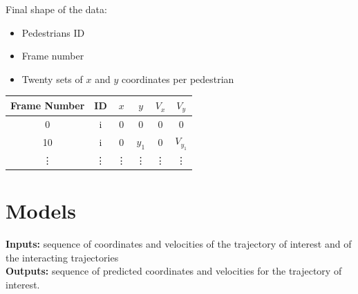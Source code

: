 \documentclass[a0,portrait]{a0poster}
\begin{document}
\begin{multicols}{2}
Final shape of the data:\\
\begin{minipage}[]{0.6\linewidth}
\begin{itemize}
\item Pedestrians ID
\item Frame number 
\item Twenty sets of $x$ and $y$ coordinates per pedestrian
\end{itemize}
\end{minipage}
\hfill
\begin{minipage}[]{0.4\linewidth}
\begin{center}
\begin{tabular}{|c|c|c|c|c|c|}
\hline
Frame Number & ID & $x$ & $y$ & $ V_x$ & $V_y$ \\ \hline
        0     &  i  &  0 &  0 &  0 &  0 \\ \hline
        10     &  i  &  0 &  $y_1$ &  0 &  $V_{y_1}$ \\ \hline
        \vdots     &  \vdots &  \vdots & \vdots &  \vdots &  \vdots \\ \hline
\end{tabular}
\end{center}
\end{minipage}
%
%


\section*{Models}
\textbf{Inputs:} sequence of coordinates and velocities of the trajectory of interest and of the interacting trajectories\\
\textbf{Outputs:} sequence of predicted coordinates and velocities for the trajectory of interest.\\


\end{multicols}
\end{document}
